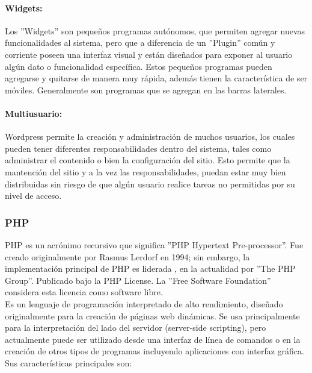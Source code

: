 \paragraph{Widgets:}
Los ''Widgets'' son pequeños programas autónomos, que permiten agregar nuevas funcionalidades al sistema, pero que a diferencia de un ''Plugin'' común y corriente poseen una interfaz visual y están diseñados para exponer al usuario algún dato o funcionalidad específica. Estos pequeños programas pueden agregarse y quitarse de manera muy rápida, además tienen la característica de ser móviles. Generalmente son programas que se agregan en las barras laterales.

\paragraph{Multiusuario:}
Wordpress permite la creación y administración de muchos usuarios, los cuales pueden tener diferentes responsabilidades dentro del sistema, tales como administrar el contenido o bien la configuración del sitio. Esto permite que la mantención del sitio y a la vez las responsabilidades, puedan estar muy bien distribuidas sin riesgo de que algún usuario realice tareas no permitidas por su nivel de acceso.

\subsubsection{PHP}
PHP es un acrónimo recursivo que significa ''PHP Hypertext Pre-processor''. Fue creado originalmente por Rasmus Lerdorf en 1994; sin embargo, la implementación principal de PHP es liderada , en la actualidad por ''The PHP Group\cite{php:1}''. Publicado bajo la PHP License. La ''Free Software Foundation'' considera esta licencia como software libre.\\

Es un lenguaje de programación interpretado de alto rendimiento, diseñado originalmente para la creación de páginas web dinámicas. Se usa principalmente para la interpretación del lado del servidor (server-side scripting), pero actualmente puede ser utilizado desde una interfaz de línea de comandos o en la creación de otros tipos de programas incluyendo aplicaciones con interfaz gráfica. Sus características principales son:

